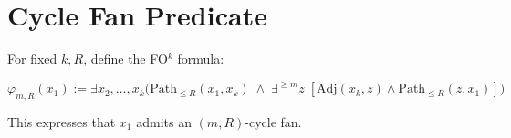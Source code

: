 \section*{Cycle Fan Predicate}

For fixed $k,R$, define the FO$^k$ formula:

\[
\varphi_{m,R}(x_1):=
\exists x_2,\dots,x_k
\Big(
\mathrm{Path}_{\le R}(x_1,x_k)
\;\wedge\;
\exists^{\ge m} z\;
[\mathrm{Adj}(x_k,z)\wedge \mathrm{Path}_{\le R}(z,x_1)]
\Big)
\]

This expresses that $x_1$ admits an $(m,R)$-cycle fan.

